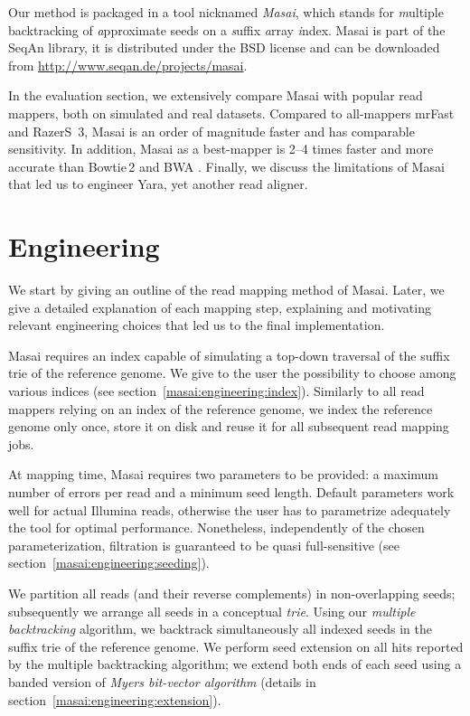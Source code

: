 Our method is packaged in a \CC tool nicknamed \emph{Masai}, which stands for \emph{m}ultiple backtracking of \emph{a}pproximate seeds on a \emph{s}uffix \emph{a}rray \emph{i}ndex.
Masai is part of the SeqAn library, it is distributed under the BSD license and can be downloaded from \url{http://www.seqan.de/projects/masai}.

In the evaluation section, we extensively compare Masai with popular read mappers, both on simulated and real datasets.
Compared to all-mappers mrFast and RazerS~3, Masai is an order of magnitude faster and has comparable sensitivity.
In addition, Masai as a best-mapper is 2--4 times faster and more accurate than Bowtie\,2 \citep{Bowtie2} and BWA \citep{BWA}.
Finally, we discuss the limitations of Masai that led us to engineer Yara, yet another read aligner.


\section{Engineering}

We start by giving an outline of the read mapping method of Masai.
Later, we give a detailed explanation of each mapping step, explaining and motivating relevant engineering choices that led us to the final implementation.

Masai requires an index capable of simulating a top-down traversal of the suffix trie of the reference genome.
We give to the user the possibility to choose among various indices (see section~\ref{masai:engineering:index}).
Similarly to all read mappers relying on an index of the reference genome, we index the reference genome only once, store it on disk and reuse it for all subsequent read mapping jobs.

At mapping time, Masai requires two parameters to be provided: a maximum number of errors per read and a minimum seed length.
Default parameters work well for actual Illumina reads, otherwise the user has to parametrize adequately the tool for optimal performance.
Nonetheless, independently of the chosen parameterization, filtration is guaranteed to be quasi full-sensitive (see section~\ref{masai:engineering:seeding}).

We partition all reads (and their reverse complements) in non-overlapping seeds;
subsequently we arrange all seeds in a conceptual \emph{trie}.
Using our \emph{multiple backtracking} algorithm, we backtrack simultaneously all indexed seeds in the suffix trie of the reference genome.
We perform seed extension on all hits reported by the multiple backtracking algorithm;
we extend both ends of each seed using a banded version of \emph{Myers bit-vector algorithm} \citep{Myers1999} (details in section~\ref{masai:engineering:extension}).


